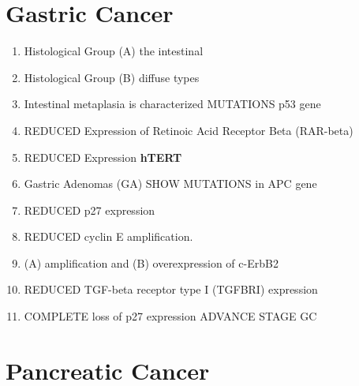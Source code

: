 
\section{Gastric Cancer}

\begin{enumerate}
	\item Histological Group (A) the intestinal \cite{key1}
	\item Histological Group (B) diffuse types  \cite{key1}
	\item Intestinal metaplasia is characterized MUTATIONS p53 gene  \cite{key1}
	\item REDUCED Expression of Retinoic Acid Receptor Beta (RAR-beta)  \cite{key1}
	\item REDUCED Expression \textbf{hTERT}   \cite{key1}
	\item Gastric Adenomas (GA) SHOW MUTATIONS in APC gene  \cite{key1}
	\item REDUCED  p27 expression \cite{key1}
	\item REDUCED cyclin E amplification.  \cite{key1} 
	\item (A) amplification and (B) overexpression of c-ErbB2  \cite{key1}
	\item REDUCED TGF-beta receptor type I (TGFBRI) expression  \cite{key1}
	\item COMPLETE loss of p27 expression ADVANCE STAGE GC \cite{key1}
\end{enumerate}

\section{Pancreatic Cancer}

